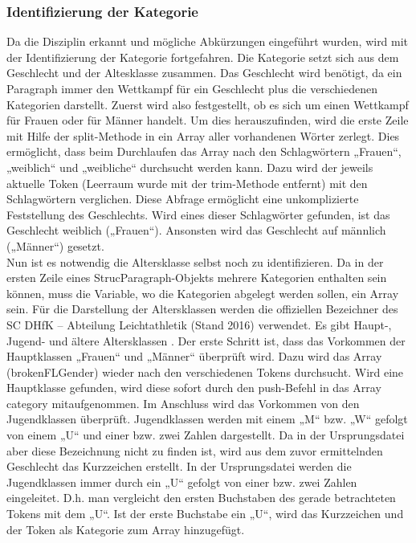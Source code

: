 \subsubsection{Identifizierung der Kategorie}
Da die Disziplin erkannt und mögliche Abkürzungen eingeführt wurden, wird mit der Identifizierung der Kategorie fortgefahren. Die Kategorie setzt sich aus dem Geschlecht und der Altesklasse zusammen. Das Geschlecht wird benötigt, da ein Paragraph immer den Wettkampf für ein Geschlecht plus die verschiedenen Kategorien darstellt. Zuerst wird also festgestellt, ob es sich um einen Wettkampf für Frauen oder für Männer handelt. Um dies herauszufinden, wird die erste Zeile mit Hilfe der split-Methode in ein Array aller vorhandenen Wörter zerlegt. Dies ermöglicht, dass beim Durchlaufen das Array nach den Schlagwörtern „Frauen“, „weiblich“ und „weibliche“ durchsucht werden kann. Dazu wird der jeweils aktuelle Token (Leerraum wurde mit der trim-Methode entfernt) mit den Schlagwörtern verglichen. Diese Abfrage ermöglicht eine unkomplizierte Feststellung des Geschlechts. Wird eines dieser Schlagwörter gefunden, ist das Geschlecht weiblich („Frauen“). Ansonsten wird das Geschlecht auf männlich („Männer“) gesetzt. \\
Nun ist es notwendig die Altersklasse selbst noch zu identifizieren. Da in der ersten Zeile eines StrucParagraph-Objekts mehrere Kategorien enthalten sein können, muss die Variable, wo die Kategorien abgelegt werden sollen, ein Array sein. Für die Darstellung der Altersklassen werden die offiziellen Bezeichner des SC DHfK – Abteilung Leichtathletik (Stand 2016) verwendet. Es gibt Haupt-, Jugend- und ältere Altersklassen \cite{altersklassen}. Der erste Schritt ist, dass das Vorkommen der Hauptklassen „Frauen“ und „Männer“ überprüft wird. Dazu wird das Array (brokenFLGender) wieder nach den verschiedenen Tokens durchsucht. Wird eine Hauptklasse gefunden, wird diese sofort durch den push-Befehl in das Array category mitaufgenommen.
Im Anschluss wird das Vorkommen von den Jugendklassen überprüft. Jugendklassen werden mit einem „M“ bzw. „W“ gefolgt von einem  „U“ und einer bzw. zwei Zahlen dargestellt. Da in der Ursprungsdatei aber diese Bezeichnung nicht zu finden ist, wird aus dem zuvor ermittelnden Geschlecht das Kurzzeichen erstellt. In der Ursprungsdatei werden die Jugendklassen immer durch ein „U“ gefolgt von einer bzw. zwei Zahlen eingeleitet. D.h. man vergleicht den ersten Buchstaben des gerade betrachteten Tokens mit dem „U“. Ist der erste Buchstabe ein „U“, wird das Kurzzeichen und der Token als Kategorie zum Array hinzugefügt. 
